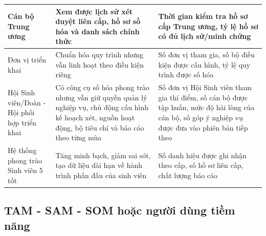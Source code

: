 \begin{longtable}{|>{\raggedright\arraybackslash}p{}|
                  >{\raggedright\arraybackslash}p{}|
                  >{\raggedright\arraybackslash}p{}|}
Cán bộ Trung ương &
Xem được lịch sử xét duyệt liên cấp, hồ sơ số hóa và danh sách chính thức &
Thời gian kiểm tra hồ sơ cấp Trung ương, tỷ lệ hồ sơ có đủ lịch sử/minh chứng \\ \hline

Đơn vị triển khai &
Chuẩn hóa quy trình nhưng vẫn linh hoạt theo điều kiện riêng &
Số đơn vị tham gia, số bộ điều kiện được cấu hình, tỷ lệ quy trình được số hóa \\ \hline

Hội Sinh viên/Đoàn - Hội phối hợp triển khai &
Có công cụ số hóa phong trào nhưng vẫn giữ quyền quản lý nghiệp vụ, chủ động cấu hình kế hoạch xét, nguồn hoạt động, bộ tiêu chí và báo cáo theo từng mùa &
Số đơn vị Hội Sinh viên tham gia thí điểm, số cán bộ được tập huấn, mức độ hài lòng của cán bộ, số góp ý nghiệp vụ được đưa vào phiên bản tiếp theo \\ \hline

Hệ thống phong trào Sinh viên 5 tốt &
Tăng minh bạch, giảm sai sót, tạo dữ liệu dài hạn về hành trình phấn đấu của sinh viên &
Số danh hiệu được ghi nhận theo cấp, số hồ sơ liên cấp, chất lượng báo cáo \\ \hline

\end{longtable}
\endgroup

\subsection{TAM - SAM - SOM hoặc người dùng tiềm năng}

\begingroup
\footnotesize
\setlength{\tabcolsep}{3pt}
\renewcommand{\arraystretch}{1.25}

